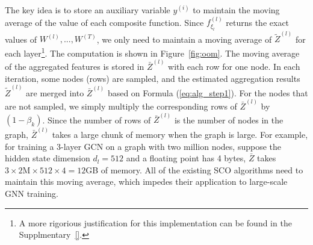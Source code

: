 The key idea is to store an auxiliary variable $y^{(i)}$ to maintain the moving average of the value of each composite function. 
Since $f^{(l)}_{\xi_l}$ returns the exact values of $W^{(l)}, ..., W^{(T)}$, we only need to maintain a moving average of $\widetilde{Z}^{(l)}$ for each layer\footnote{A more rigorious justification for this implementation can be found in the Supplmentary~\ref{}.}. 
The computation is shown in Figure~\ref{fig:oom}. 
The moving average of the aggregated features is stored in $\bar{Z}^{(l)}$ with each row for one node. 
In each iteration, some nodes (rows) are sampled, and the estimated aggregation results $\widetilde{Z}^{(l)}$ are merged into $\bar{Z}^{(l)}$ based on Formula (\ref{eq:alg_step1}). 
For the nodes that are not sampled, we simply multiply the corresponding rows of  $\bar{Z}^{(l)}$ by $(1-\beta_k)$. 
Since the number of rows of $\bar{Z}^{(l)}$ is the number of nodes in the graph, $\bar{Z}^{(l)}$ takes a large chunk of memory when the graph is large. 
For example, for training a 3-layer GCN on a graph with two million nodes, suppose the hidden state dimension $d_l=512$ and a floating point has 4 bytes, $\bar{Z}$ takes $3\times 2\text{M} \times 512 \times 4=12$GB of memory. 
All of the existing SCO algorithms need to maintain this moving average, which impedes their application to large-scale GNN training. 








